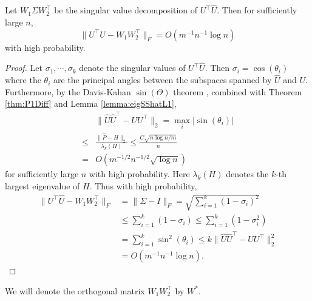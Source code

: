 \begin{lemma}
\label{lemma:AlmostOrthogonalL1}
Let $W_1 \Sigma W_2^{\top}$ be the singular value decomposition of $U^{\top} \hat{U}$. Then for sufficiently large $n$, 
\[
	\| U^{\top} \hat{U} - W_1 W_2^{\top} \|_F = O(m^{-1} n^{-1} \log n)
\]
with high probability.
\end{lemma}
\begin{proof}
Let $\sigma_1, \cdots, \sigma_k$ denote the singular values of $U^{\top} \hat{U}$. Then $\sigma_i = \cos(\theta_i)$ where the $\theta_i$ are the principal angles between the subspaces spanned by $\hat{U}$ and $U$. Furthermore, by the Davis-Kahan $\sin(\Theta)$ theorem \citep{davis1970rotation}, combined with Theorem \ref{thm:P1Diff} and Lemma \ref{lemma:eigSShatL1},
\begin{equation}
\label{eqn:uhat2u2diffL1}
\begin{split}
	& \|\hat{U} \hat{U}^{\top} - U U^{\top}\|_2 = \max_i |\sin(\theta_i)| \\
    \le & \frac{\|\hat{P} - H\|_2}{\lambda_k(H)}
    \le \frac{C \sqrt{n \log n/m}}{n} \\
    = & O(m^{-1/2} n^{-1/2} \sqrt{\log n})
\end{split}
\end{equation}
for sufficiently large $n$ with high probability. Here $\lambda_k(H)$ denotes the $k$-th largest eigenvalue of $H$.
Thus with high probability, 
\begin{align*}
	\| U^{\top} \hat{U} - W_1 W_2^{\top} \|_F
    & = \| \Sigma - I \|_F
    = \sqrt{\sum_{i=1}^k (1-\sigma_i)^2} \\
    & \le \sum_{i=1}^k (1-\sigma_i) \le \sum_{i=1}^k (1-\sigma_i^2) \\
    & = \sum_{i=1}^k \sin^2(\theta_i)
    \le k \|\hat{U} \hat{U}^{\top} - U U^{\top}\|_2^2 \\
    & = O(m^{-1} n^{-1} \log n).
\end{align*}
\end{proof}

We will denote the orthogonal matrix $W_1 W_2^{\top}$ by $W^*$.

